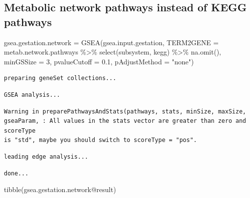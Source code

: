 \documentclass[
  24px,
  letterpaper,
  DIV=11,
  numbers=noendperiod]{scrartcl}
\newenvironment{Shaded}{\begin{snugshade}}{\end{snugshade}}
\newcommand{\AttributeTok}[1]{\textcolor[rgb]{0.40,0.45,0.13}{#1}}
\newcommand{\DecValTok}[1]{\textcolor[rgb]{0.68,0.00,0.00}{#1}}
\newcommand{\FloatTok}[1]{\textcolor[rgb]{0.68,0.00,0.00}{#1}}
\newcommand{\FunctionTok}[1]{\textcolor[rgb]{0.28,0.35,0.67}{#1}}
\newcommand{\NormalTok}[1]{\textcolor[rgb]{0.00,0.23,0.31}{#1}}
\newcommand{\OtherTok}[1]{\textcolor[rgb]{0.00,0.23,0.31}{#1}}
\newcommand{\SpecialCharTok}[1]{\textcolor[rgb]{0.37,0.37,0.37}{#1}}
\newcommand{\StringTok}[1]{\textcolor[rgb]{0.13,0.47,0.30}{#1}}
\begin{document}
\hypertarget{metabolic-network-pathways-instead-of-kegg-pathways}{%
\subsection{Metabolic network pathways instead of KEGG
pathways}\label{metabolic-network-pathways-instead-of-kegg-pathways}}

\begin{Shaded}
\begin{Highlighting}[]
\NormalTok{gsea.gestation.network }\OtherTok{=} \FunctionTok{GSEA}\NormalTok{(gsea.input.gestation, }
                      \AttributeTok{TERM2GENE =}\NormalTok{ metab.network.pathways }\SpecialCharTok{\%\textgreater{}\%} \FunctionTok{select}\NormalTok{(subsystem, kegg) }\SpecialCharTok{\%\textgreater{}\%} \FunctionTok{na.omit}\NormalTok{(),}
                      \AttributeTok{minGSSize =} \DecValTok{3}\NormalTok{, }\AttributeTok{pvalueCutoff =} \FloatTok{0.1}\NormalTok{, }\AttributeTok{pAdjustMethod =} \StringTok{"none"}\NormalTok{)}
\end{Highlighting}
\end{Shaded}

\begin{verbatim}
preparing geneSet collections...
\end{verbatim}

\begin{verbatim}
GSEA analysis...
\end{verbatim}

\begin{verbatim}
Warning in preparePathwaysAndStats(pathways, stats, minSize, maxSize,
gseaParam, : All values in the stats vector are greater than zero and scoreType
is "std", maybe you should switch to scoreType = "pos".
\end{verbatim}

\begin{verbatim}
leading edge analysis...
\end{verbatim}

\begin{verbatim}
done...
\end{verbatim}

\begin{Shaded}
\begin{Highlighting}[]
\FunctionTok{tibble}\NormalTok{(gsea.gestation.network}\SpecialCharTok{@}\NormalTok{result)}
\end{Highlighting}
\end{Shaded}
\end{document}
